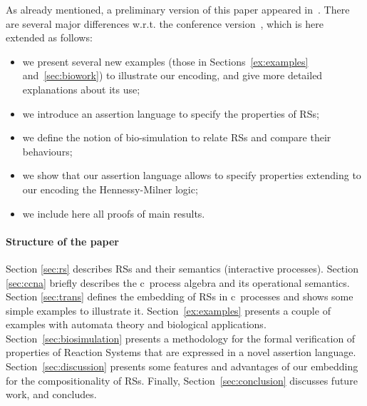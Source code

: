 As already mentioned, a preliminary version of this paper appeared in~\cite{BBF19}.
There are several major differences w.r.t. the conference version~\cite{BBF19}, which is here extended as follows:
\begin{itemize}
\item we present several new examples (those in Sections~\ref{ex:examples} and~\ref{sec:biowork}) to illustrate our 
 encoding,
and give more detailed explanations about its use;
\item we introduce an assertion language to specify the properties of RSs;
\item we define the notion of bio-simulation to relate RSs
and compare their behaviours;
\item we show that our assertion language allows to specify properties extending to our
encoding
the Hennessy-Milner logic;
\item we include here all proofs of main results.
\end{itemize}
 
\paragraph{Structure of the paper} 

Section \ref{sec:rs} 
describes RSs and their semantics (interactive processes).
Section \ref{sec:ccna} briefly describes  the c\CNA \ process algebra and
its operational semantics.
Section \ref{sec:trans} defines the embedding of RSs in
c\CNA \ processes and shows some simple examples to illustrate 
it.
Section~\ref{ex:examples} presents a couple of examples with automata theory and biological applications.
Section~\ref{sec:biosimulation} presents a methodology for the formal verification of
properties of Reaction Systems that are expressed in a novel assertion language.
Section~\ref{sec:discussion} presents some features and 
advantages of our embedding for the compositionality of RSs.
Finally, Section~\ref{sec:conclusion}
discusses future work, and concludes.


